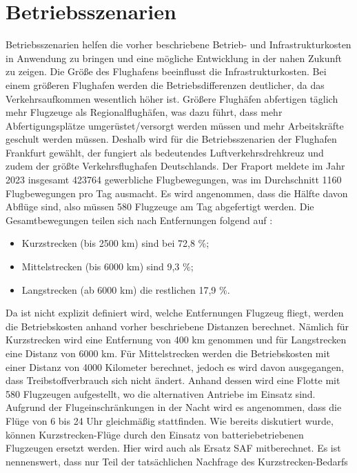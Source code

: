 
\section{Betriebsszenarien}
\label{s:Betriebsszenarien}
Betriebsszenarien helfen die vorher beschriebene Betrieb- und Infrastrukturkosten in Anwendung zu bringen 
und eine mögliche Entwicklung in der nahen Zukunft zu zeigen. 
Die Größe des Flughafens beeinflusst die Infrastrukturkosten. 
Bei einem größeren Flughafen werden die Betriebsdifferenzen deutlicher, da das Verkehrsaufkommen wesentlich höher ist.
Größere Flughäfen abfertigen täglich mehr Flugzeuge als Regionalflughäfen, 
was dazu führt, dass mehr Abfertigungsplätze umgerüstet/versorgt werden müssen und mehr Arbeitskräfte geschult werden müssen.
%
Deshalb wird für die Betriebsszenarien der Flughafen Frankfurt gewählt, der fungiert als bedeutendes Luftverkehrsdrehkreuz
und zudem der größte Verkehrsflughafen Deutschlands.
Der Fraport meldete im Jahr 2023 insgesamt 423764 gewerbliche Flugbewegungen, was im Durchschnitt 1160 Flugbewegungen pro Tag ausmacht. 
Es wird angenommen, dass die Hälfte davon Abflüge sind, also müssen 580 Flugzeuge am Tag abgefertigt werden.
%
Die Gesamtbewegungen teilen sich nach Entfernungen folgend auf \cite{fraport2023frankfurt}:
\begin{itemize}
    \item Kurzstrecken (bis 2500 km) sind bei 72,8 \%;
    \item Mittelstrecken (bis 6000 km) sind 9,3 \%;
    \item Langstrecken (ab 6000 km) die restlichen 17,9 \%. 
    \end{itemize}
Da ist nicht explizit definiert wird, welche Entfernungen Flugzeug fliegt, werden die Betriebskosten anhand vorher beschriebene Distanzen berechnet.
Nämlich für Kurzstrecken wird eine Entfernung von 400 km genommen und für Langstrecken eine Distanz von 6000 km. Für Mittelstrecken
werden die Betriebskosten mit einer Distanz von 4000 Kilometer berechnet, jedoch es wird davon ausgegangen, dass Treibstoffverbrauch sich nicht ändert.
%
Anhand dessen wird eine Flotte mit 580 Flugzeugen aufgestellt, wo die alternativen Antriebe im Einsatz sind.
Aufgrund der Flugeinschränkungen in der Nacht wird es angenommen, dass die Flüge von 6 bis 24 Uhr gleichmäßig stattfinden. 
Wie bereits diskutiert wurde, können Kurzstrecken-Flüge durch den Einsatz von batteriebetriebenen Flugzeugen ersetzt werden. Hier wird
auch als Ersatz SAF mitberechnet. Es ist nennenswert, dass nur Teil der tatsächlichen Nachfrage des Kurzstrecken-Bedarfs 
